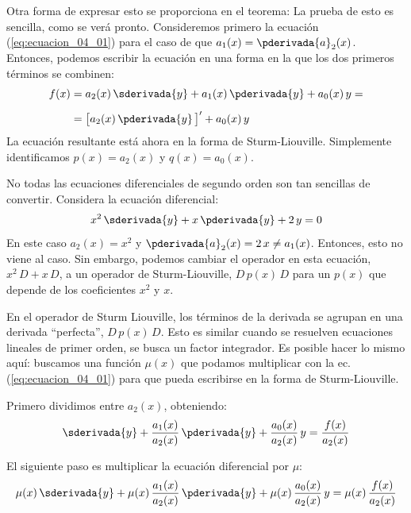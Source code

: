 Otra forma de expresar esto se proporciona en el teorema: La prueba de esto es sencilla, como se verá pronto. Consideremos primero la ecuación (\ref{eq:ecuacion_04_01}) para el caso de que $a_{1} (x) = \pderivada{a}_{2} (x)$. Entonces, podemos escribir la ecuación en una forma en la que los dos primeros términos se combinen:
\begin{align}
\begin{aligned}
f(x) &= a_{2} (x) \, \sderivada{y} + a_{1} (x) \, \pderivada{y} + a_{0} (x) \, y = \\[0.5em]
&= \big[ a_{2} (x) \, \pderivada{y} \, \big]^{\prime} + a_{0} (x) \, y
\end{aligned}
\label{eq:ecuacion_04_06}
\end{align}
La ecuación resultante está ahora en la forma de Sturm-Liouville. Simplemente identificamos $p(x) = a_{2} (x)$ y $q (x) = a_{0} (x)$.
\par
No todas las ecuaciones diferenciales de segundo orden son tan sencillas de convertir. Considera la ecuación diferencial:
\begin{align*}
x^{2} \, \sderivada{y} + x \, \pderivada{y} + 2 \, y = 0
\end{align*}
En este caso $a_{2} (x) = x^{2}$ y $\pderivada{a}_{2} (x) = 2 \, x \neq a_{1} (x)$. Entonces, esto no viene al caso. Sin embargo, podemos cambiar el operador en esta ecuación, $x^{2} \, D + x \, D$, a un operador de Sturm-Liouville, $D \, p (x) \, D$ para un $p (x)$ que depende de los coeficientes $x^{2}$ y $x$.
\par
En el operador de Sturm Liouville, los términos de la derivada se agrupan en una derivada \enquote{perfecta}, $D \, p (x) \, D$. Esto es similar cuando se resuelven ecuaciones lineales de primer orden, se busca un factor integrador. Es posible hacer lo mismo aquí: buscamos una función $\mu (x)$ que podamos multiplicar con la ec. (\ref{eq:ecuacion_04_01}) para que pueda escribirse en la forma de Sturm-Liouville.
\par
Primero dividimos entre $a_{2} (x)$, obteniendo:
\begin{align*}
\sderivada{y} + \dfrac{a_{1}(x)}{a_{2}(x)} \, \pderivada{y} + \dfrac{a_{0}(x)}{a_{2}(x)} \, y = \dfrac{f(x)}{a_{2}(x)}
\end{align*}

El siguiente paso es multiplicar la ecuación diferencial por $\mu$:
\begin{align*}
\mu(x) \, \sderivada{y} + \mu(x) \, \dfrac{a_{1}(x)}{a_{2}(x)} \, \pderivada{y} + \mu(x) \, \dfrac{a_{0}(x)}{a_{2}(x)} \, y = \mu(x) \, \dfrac{f(x)}{a_{2}(x)}
\end{align*}

